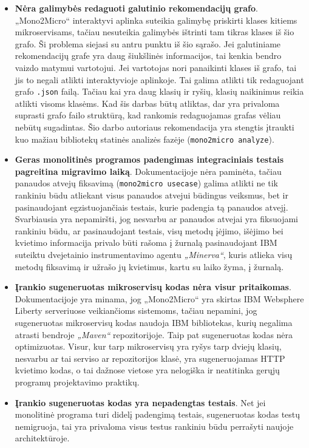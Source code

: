 \documentclass{VUMIFPSbakalaurinis}
\begin{document}
\begin{itemize}
    \item \textbf{Nėra galimybės redaguoti galutinio rekomendacijų grafo}. „Mono2Micro“ interaktyvi aplinka suteikia galimybę priskirti klases kitiems mikroservisams, tačiau nesuteikia galimybės ištrinti tam tikras klases iš šio grafo. Ši problema siejasi su antru punktu iš šio sąrašo. Jei galutiniame rekomendacijų grafe yra daug šiukšlinės informacijos, tai kenkia bendro vaizdo matymui vartotojui. Jei vartotojas nori panaikinti klases iš grafo, tai jis to negali atlikti interaktyvioje aplinkoje. Tai galima atlikti tik redaguojant grafo \verb|.json| failą. Tačiau kai yra daug klasių ir ryšių, klasių naikinimus reikia atlikti visoms klasėms. Kad šis darbas būtų atliktas, dar yra privaloma suprasti grafo failo struktūrą, kad rankomis redaguojamas grafas vėliau nebūtų sugadintas. Šio darbo autoriaus rekomendacija yra stengtis įtraukti kuo mažiau bibliotekų statinės analizės fazėje (\verb|mono2micro analyze|).

    \item \textbf{Geras monolitinės programos padengimas integraciniais testais pagreitina migravimo laiką}. Dokumentacijoje nėra paminėta, tačiau panaudos atvejų fiksavimą (\verb|mono2micro usecase|) galima atlikti ne tik rankiniu būdu atliekant visus panaudos atvejui būdingus veiksmus, bet ir pasinaudojant egzistuojančiais testais, kurie padengia tą panaudos atvejį. Svarbiausia yra nepamiršti, jog nesvarbu ar panaudos atvejai yra fiksuojami rankiniu būdu, ar pasinaudojant testais, visų metodų įėjimo, išėjimo bei kvietimo informacija privalo būti rašoma į žurnalą pasinaudojant IBM suteiktu dvejetainio instrumentavimo agentu \emph{„Minerva“}, kuris atlieka visų metodų fiksavimą ir užrašo jų kvietimus, kartu su laiko žyma, į žurnalą.

    \item \textbf{Įrankio sugeneruotas mikroservisų kodas nėra visur pritaikomas}. Dokumentacijoje yra minama, jog „Mono2Micro“ yra skirtas IBM Websphere Liberty serveriuose veikiančioms sistemoms, tačiau nepamini, jog sugeneruotas mikroservisų kodas naudoja IBM bibliotekas, kurių negalima atrasti bendroje \emph{„Maven“} repozitorijoje. Taip pat sugeneruotas kodas nėra optimizuotas. Visur, kur tarp mikroservisų yra ryšys tarp dviejų klasių, nesvarbu ar tai serviso ar repozitorijos klasė, yra sugeneruojamas HTTP kvietimo kodas, o tai dažnose vietose yra nelogiška ir neatitinka gerųjų programų projektavimo praktikų.

    \item \textbf{Įrankio sugeneruotas kodas yra nepadengtas testais}. Net jei monolitinė programa turi didelį padengimą testais, sugeneruotas kodas testų nemigruoja, tai yra privaloma visus testus rankiniu būdu perrašyti naujoje architektūroje.
\end{itemize}
\end{document}
